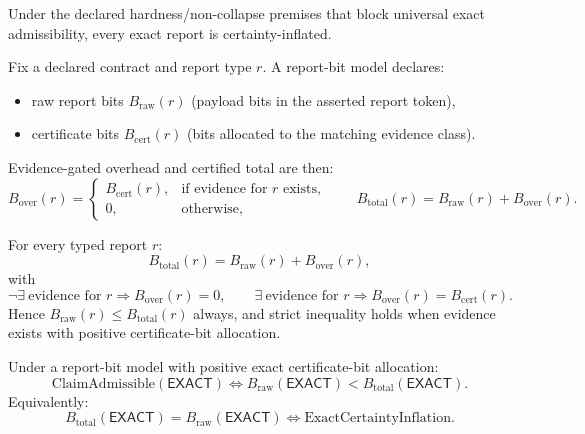 \begin{corollary}\label{cor:hardness-exact-certainty-inflation}
Under the declared hardness/non-collapse premises that block universal exact admissibility, every exact report is certainty-inflated.
\end{corollary}

\begin{definition}\label{def:raw-certified-bits}
Fix a declared contract and report type $r$.
A report-bit model declares:
\begin{itemize}
\item raw report bits $B_{\mathrm{raw}}(r)$ (payload bits in the asserted report token),
\item certificate bits $B_{\mathrm{cert}}(r)$ (bits allocated to the matching evidence class).
\end{itemize}
Evidence-gated overhead and certified total are then:
\[
B_{\mathrm{over}}(r)=
\begin{cases}
B_{\mathrm{cert}}(r), & \text{if evidence for }r\text{ exists},\\
0, & \text{otherwise},
\end{cases}
\qquad
B_{\mathrm{total}}(r)=B_{\mathrm{raw}}(r)+B_{\mathrm{over}}(r).
\]
\end{definition}

\begin{proposition}\label{prop:raw-certified-bit-split}
For every typed report $r$:
\[
B_{\mathrm{total}}(r)=B_{\mathrm{raw}}(r)+B_{\mathrm{over}}(r),
\]
with
\[
\neg\exists\ \text{evidence for }r \Rightarrow B_{\mathrm{over}}(r)=0,\qquad
\exists\ \text{evidence for }r \Rightarrow B_{\mathrm{over}}(r)=B_{\mathrm{cert}}(r).
\]
Hence $B_{\mathrm{raw}}(r)\le B_{\mathrm{total}}(r)$ always, and strict inequality holds when evidence exists with positive certificate-bit allocation.
\end{proposition}

\begin{theorem}\label{thm:exact-certified-gap-iff-admissible}
Under a report-bit model with positive exact certificate-bit allocation:
\[
\text{ClaimAdmissible}(\mathsf{EXACT})
\iff
B_{\mathrm{raw}}(\mathsf{EXACT})<B_{\mathrm{total}}(\mathsf{EXACT}).
\]
Equivalently:
\[
B_{\mathrm{total}}(\mathsf{EXACT})=B_{\mathrm{raw}}(\mathsf{EXACT})
\iff
\text{ExactCertaintyInflation}.
\]
\end{theorem}

